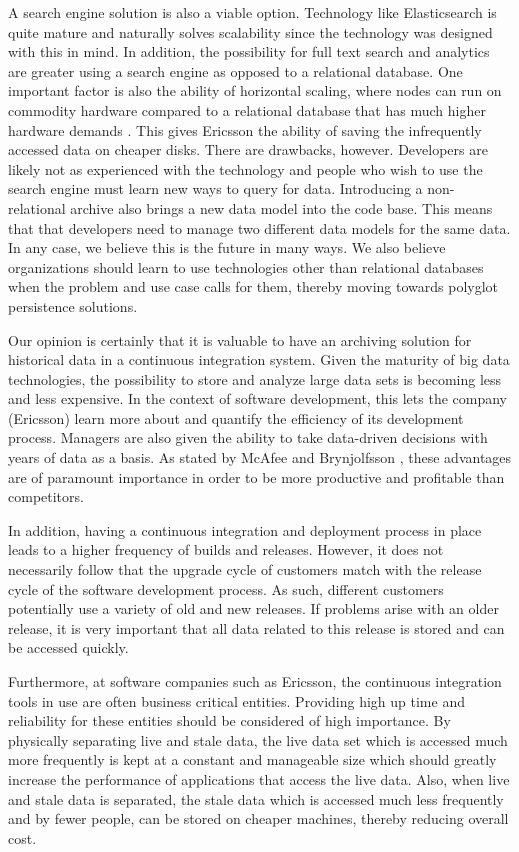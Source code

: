 A search engine solution is also a viable option. Technology like Elasticsearch is quite mature and naturally solves scalability since the technology was designed with this in mind. In addition, the possibility for full text search and analytics are greater using a search engine as opposed to a relational database. One important factor is also the ability of horizontal scaling, where nodes can run on commodity hardware compared to a relational database that has much higher hardware demands \cite{NoSQLERA}. This gives Ericsson the ability of saving the infrequently accessed data on cheaper disks. There are drawbacks, however. Developers are likely not as experienced with the technology and people who wish to use the search engine must learn new ways to query for data. Introducing a non-relational archive also brings a new data model into the code base. This means that that developers need to manage two different data models for the same data. In any case, we believe this is the future in many ways. We also believe organizations should learn to use technologies other than relational databases when the problem and use case calls for them, thereby moving towards polyglot persistence solutions.

Our opinion is certainly that it is valuable to have an archiving solution for historical data in a continuous integration system. Given the maturity of big data technologies, the possibility to store and analyze large data sets is becoming less and less expensive. In the context of software development, this lets the company (Ericsson) learn more about and quantify the efficiency of its development process. Managers are also given the ability to take data-driven decisions with years of data as a basis. As stated by McAfee and Brynjolfsson \cite{bigDataMane}, these advantages are of paramount importance in order to be more productive and profitable than competitors.

In addition, having a continuous integration and deployment process in place leads to a higher frequency of builds and releases. However, it does not necessarily follow that the upgrade cycle of customers match with the release cycle of the software development process. As such, different customers potentially use a variety of old and new releases. If problems arise with an older release, it is very important that all data related to this release is stored and can be accessed quickly.

Furthermore, at software companies such as Ericsson, the continuous integration tools in use are often business critical entities. Providing high up time and reliability for these entities should be considered of high importance. By physically separating live and stale data, the live data set which is accessed much more frequently is kept at a constant and manageable size which should greatly increase the performance of applications that access the live data. Also, when live and stale data is separated, the stale data which is accessed much less frequently and by fewer people, can be stored on cheaper machines, thereby reducing overall cost.

